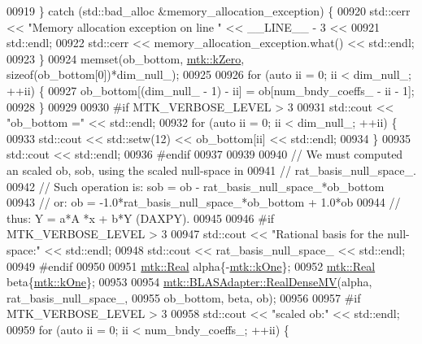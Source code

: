 \begin{DoxyCode}
{{00919     \} \textcolor{keywordflow}{catch} (std::bad\_alloc &memory\_allocation\_exception) \{
00920       std::cerr << \textcolor{stringliteral}{"Memory allocation exception on line "} << \_\_LINE\_\_ - 3 <<
00921         std::endl;
00922       std::cerr << memory\_allocation\_exception.what() << std::endl;
00923     \}
00924     memset(ob\_bottom, \hyperlink{group__c01-roots_ga59a451a5fae30d59649bcda274fea271}{mtk::kZero}, \textcolor{keyword}{sizeof}(ob\_bottom[0])*dim\_null\_);
00925 
00926     \textcolor{keywordflow}{for} (\textcolor{keyword}{auto} ii = 0; ii < dim\_null\_; ++ii) \{
00927       ob\_bottom[(dim\_null\_ - 1) - ii] = ob[num\_bndy\_coeffs\_ - ii - 1];
00928     \}
00929 
00930 \textcolor{preprocessor}{    #if MTK\_VERBOSE\_LEVEL > 3}
00931     std::cout << \textcolor{stringliteral}{"ob\_bottom ="} << std::endl;
00932     \textcolor{keywordflow}{for} (\textcolor{keyword}{auto} ii = 0; ii < dim\_null\_; ++ii) \{
00933       std::cout << std::setw(12) << ob\_bottom[ii] << std::endl;
00934     \}
00935     std::cout << std::endl;
00936 \textcolor{preprocessor}{    #endif}
00937 
00939 
00940     \textcolor{comment}{// We must computed an scaled ob, sob, using the scaled null-space in}
00941     \textcolor{comment}{// rat\_basis\_null\_space\_.}
00942     \textcolor{comment}{// Such operation is: sob = ob - rat\_basis\_null\_space\_*ob\_bottom}
00943     \textcolor{comment}{// or:                 ob = -1.0*rat\_basis\_null\_space\_*ob\_bottom + 1.0*ob}
00944     \textcolor{comment}{// thus:                Y =    a*A    *x         +   b*Y (DAXPY).}
00945 
00946 \textcolor{preprocessor}{    #if MTK\_VERBOSE\_LEVEL > 3}
00947     std::cout << \textcolor{stringliteral}{"Rational basis for the null-space:"} << std::endl;
00948     std::cout << rat\_basis\_null\_space\_ << std::endl;
00949 \textcolor{preprocessor}{    #endif}
00950 
00951     \hyperlink{group__c01-roots_gac080bbbf5cbb5502c9f00405f894857d}{mtk::Real} alpha\{-\hyperlink{group__c01-roots_ga26407c24d43b6b95480943340d285c71}{mtk::kOne}\};
00952     \hyperlink{group__c01-roots_gac080bbbf5cbb5502c9f00405f894857d}{mtk::Real} beta\{\hyperlink{group__c01-roots_ga26407c24d43b6b95480943340d285c71}{mtk::kOne}\};
00953 
00954     \hyperlink{classmtk_1_1BLASAdapter_afdcac059a4294287cb55638221220646}{mtk::BLASAdapter::RealDenseMV}(alpha, rat\_basis\_null\_space\_,
00955                                   ob\_bottom, beta, ob);
00956 
00957 \textcolor{preprocessor}{    #if MTK\_VERBOSE\_LEVEL > 3}
00958     std::cout << \textcolor{stringliteral}{"scaled ob:"} << std::endl;
00959     \textcolor{keywordflow}{for} (\textcolor{keyword}{auto} ii = 0; ii < num\_bndy\_coeffs\_; ++ii) \{
}}
\end{DoxyCode}
